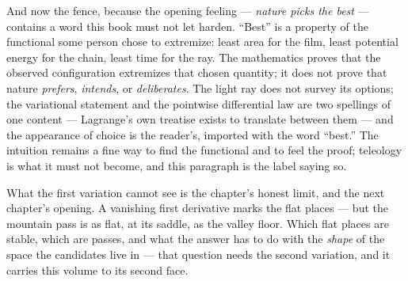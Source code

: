 And now the fence, because the opening feeling --- \emph{nature picks
the best} --- contains a word this book must not let harden. ``Best'' is
a property of the functional some person chose to extremize: least area
for the film, least potential energy for the chain, least time for the
ray. The mathematics proves that the observed configuration extremizes
that chosen quantity; it does not prove that nature \emph{prefers},
\emph{intends}, or \emph{deliberates}. The light ray does not survey its
options; the variational statement and the pointwise differential law
are two spellings of one content --- Lagrange's own treatise exists to
translate between them --- and the appearance of choice is the reader's,
imported with the word ``best.'' The intuition remains a fine way to
find the functional and to feel the proof; teleology is what it must
not become, and this paragraph is the label saying so.

What the first variation cannot see is the chapter's honest limit, and
the next chapter's opening. A vanishing first derivative marks the flat
places --- but the mountain pass is as flat, at its saddle, as the
valley floor. Which flat places are stable, which are passes, and what
the answer has to do with the \emph{shape} of the space the candidates
live in --- that question needs the second variation, and it carries
this volume to its second face.
